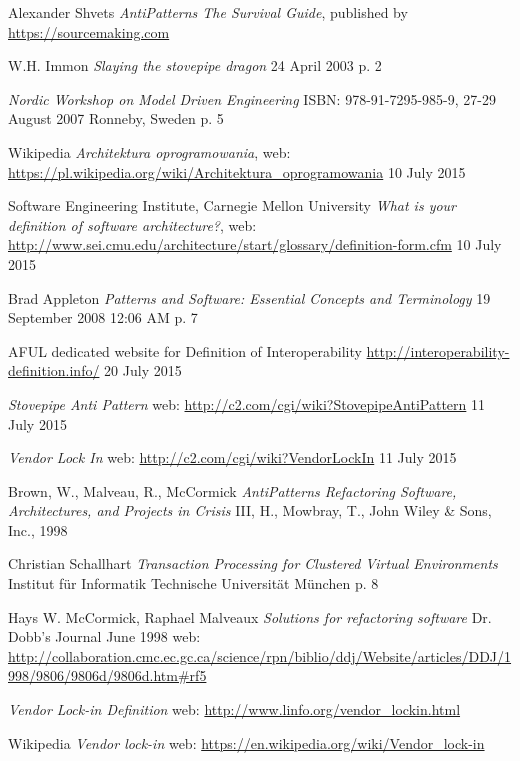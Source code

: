 \begin{thebibliography}{9}
     
    Alexander Shvets
    \emph{AntiPatterns The Survival Guide},
    published by \url{https://sourcemaking.com}
    
    W.H. Immon
    \emph{Slaying the stovepipe dragon}
    24 April 2003
    p. 2
    
    \emph{Nordic Workshop on Model Driven Engineering}
    ISBN: 978-91-7295-985-9,
    27-29 August 2007 Ronneby, Sweden
    p. 5
    
    Wikipedia
    \emph{Architektura oprogramowania},
    web: \url{https://pl.wikipedia.org/wiki/Architektura_oprogramowania}
    10 July 2015
    
    Software Engineering Institute, Carnegie Mellon University
    \emph{What is your definition of software architecture?},
    web: \url{http://www.sei.cmu.edu/architecture/start/glossary/definition-form.cfm}
    10 July 2015
    
     Brad Appleton
     \emph{Patterns and Software: Essential Concepts and Terminology}
     19 September 2008 12:06 AM
     p. 7
     
    AFUL dedicated website for Definition of Interoperability
    \url{http://interoperability-definition.info/}
    20 July 2015
     
    \emph{Stovepipe Anti Pattern}
    web: \url{http://c2.com/cgi/wiki?StovepipeAntiPattern}
    11 July 2015
    
    \emph{Vendor Lock In}
    web: \url{http://c2.com/cgi/wiki?VendorLockIn}
    11 July 2015
    
    Brown, W., Malveau, R., McCormick
    \emph{AntiPatterns Refactoring Software, Architectures, and Projects in Crisis}
    III, H., Mowbray, T., John Wiley \& Sons, Inc., 1998
    
    Christian Schallhart
    \emph{Transaction Processing for Clustered Virtual Environments}
    Institut für Informatik
    Technische Universität München
    p. 8
    
    Hays W. McCormick, Raphael Malveaux
    \emph{Solutions for refactoring software}
    Dr. Dobb's Journal June 1998
    web: \url{http://collaboration.cmc.ec.gc.ca/science/rpn/biblio/ddj/Website/articles/DDJ/1998/9806/9806d/9806d.htm#rf5}
    
    \emph{Vendor Lock-in Definition}
    web: \url{http://www.linfo.org/vendor_lockin.html}
    
    Wikipedia
    \emph{Vendor lock-in}
    web: \url{https://en.wikipedia.org/wiki/Vendor_lock-in}

\end{thebibliography}